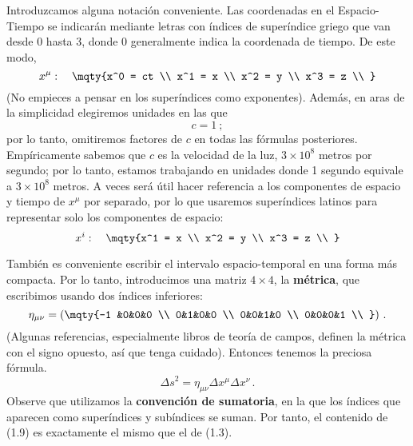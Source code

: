 \documentclass[11pt,b5paper,openany,twoside]{book}
\newcommand{\mn}{{\mu\nu}}
\begin{document}
Introduzcamos alguna notación conveniente.
Las coordenadas en el Espacio-Tiempo se indicarán mediante letras con índices de superíndice griego que van desde $0$ hasta $3$, donde $0$ generalmente indica la coordenada de tiempo.
De este modo,
\begin{equation}
x^\mu :\quad \mqty{x^0 = ct  \\  x^1 = x \\  x^2 = y \\  x^3 = z \\ }
\label{1.5}
\end{equation}
(No empieces a pensar en los superíndices como exponentes).
Además, en aras de la simplicidad elegiremos unidades en las que
\begin{equation}
c = 1 \ ;\label{1.6}
\end{equation}
por lo tanto, omitiremos factores de $c$ en todas las fórmulas posteriores.
Empíricamente sabemos que $c$ es la velocidad de la luz, $3\times 10^8$ metros por segundo; por lo tanto, estamos trabajando en unidades donde 1 segundo equivale a $3\times 10^8$ metros.
A veces será útil hacer referencia a los componentes de espacio y tiempo de $x^\mu$ por separado, por lo que usaremos superíndices latinos para representar solo los componentes de espacio:
\begin{equation}
x^i :\quad \mqty{x^1 = x \\  x^2 = y \\  x^3 = z \\ }\label{1.7}
\end{equation}

También es conveniente escribir el intervalo espacio-temporal en una forma más compacta.
Por lo tanto, introducimos una matriz $4\times 4$, la {\bf métrica}, que escribimos usando dos índices inferiores:
\begin{equation}
\eta_{\mn} = \left(\mqty{-1 &0&0&0 \\  0&1&0&0 \\
0&0&1&0  \\  0&0&0&1 \\ }\right)\,.\label{1.8}
\end{equation}
(Algunas referencias, especialmente libros de teoría de campos, definen la métrica con el signo opuesto, así que tenga cuidado).
Entonces tenemos la preciosa fórmula.
\begin{equation}
{\Delta s}^2 = \eta_\mn \Delta x^\mu \Delta x^\nu\,. \label{1.9}
\end{equation}
Observe que utilizamos la {\bf convención de sumatoria}, en la que los índices que aparecen como superíndices y subíndices se suman.
Por tanto, el contenido de (1.9) es exactamente el mismo que el de (1.3).
\end{document}
